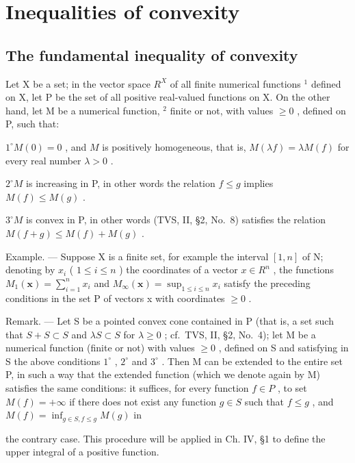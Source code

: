 \chapter{Inequalities of convexity}

\section{The fundamental inequality of convexity}

Let X be a set; in the vector space \(R^{X}\) of all finite numerical functions \(^{1}\) defined on X, let P be the set of all positive real-valued functions on X. On the other hand, let M be a numerical function, \(^{2}\) finite or not, with values \(\geqslant0\) , defined on P, such that:

\(1^{\circ} M(0) = 0\) , and \(M\) is positively homogeneous, that is, \(M(\lambda f) = \lambda M(f)\) for every real number \(\lambda > 0\) .

\(2^{\circ} M\) is increasing in P, in other words the relation \(f \leqslant g\) implies \(M(f) \leqslant M(g)\) .

\(3^{\circ} M\) is convex in P, in other words (TVS, II, §2, No.~8) satisfies the relation \(M(f + g) \leqslant M(f) + M(g)\) .

Example. --- Suppose X is a finite set, for example the interval \([1,n]\) of N; denoting by \(x_{i}\) ( \(1 \leqslant i \leqslant n\) ) the coordinates of a vector \(x \in R^{n}\) , the functions \(M_{1}(\mathbf{x}) = \sum_{i=1}^{n} x_{i}\) and \(M_{\infty}(\mathbf{x}) = \sup_{1 \leqslant i \leqslant n} x_{i}\) satisfy the preceding conditions in the set P of vectors x with coordinates \(\geqslant 0\) .

Remark. --- Let S be a pointed convex cone contained in P (that is, a set such that \(S + S \subset S\) and \(\lambda S \subset S\) for \(\lambda \geqslant 0\) ; cf.~TVS, II, §2, No.~4); let M be a numerical function (finite or not) with values \(\geqslant 0\) , defined on S and satisfying in S the above conditions \(1^{\circ}\) , \(2^{\circ}\) and \(3^{\circ}\) . Then M can be extended to the entire set P, in such a way that the extended function (which we denote again by M) satisfies the same conditions: it suffices, for every function \(f \in P\) , to set \(M(f) = +\infty\) if there does not exist any function \(g \in S\) such that \(f \leqslant g\) , and \(M(f) = \inf_{g \in S, f \leqslant g} M(g)\) in

the contrary case. This procedure will be applied in Ch. IV, §1 to define the upper integral of a positive function.

